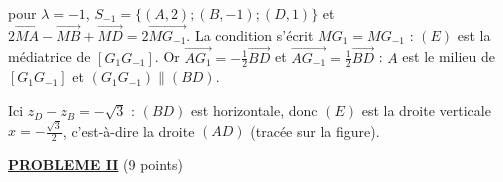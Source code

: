 \begin{description}
\begin{enumerate}
\begin{enumerate}
				pour $\lambda = -1$, $S_{-1} = \{(A,2);(B,-1);(D,1)\}$ et $2\overrightarrow{MA} - \overrightarrow{MB} + \overrightarrow{MD} = 2\overrightarrow{MG_{-1}}$.
				La condition s'écrit $MG_1 = MG_{-1}$ : $(E)$ est la médiatrice de $[G_1G_{-1}]$.
				Or $\overrightarrow{AG_1} = -\frac{1}{2}\overrightarrow{BD}$ et $\overrightarrow{AG_{-1}} = \frac{1}{2}\overrightarrow{BD}$ : $A$ est le milieu de $[G_1G_{-1}]$ et $(G_1G_{-1}) \parallel (BD)$.
				\par\noindent{}
				Ici $z_D - z_B = -\sqrt{3}$ : $(BD)$ est horizontale, donc $(E)$ est la droite verticale $x = -\frac{\sqrt{3}}{2}$, c'est-à-dire la droite $(AD)$ (tracée sur la figure).
		\end{enumerate}
	\end{enumerate}
\end{description}
\noindent \underline{\textsc{\textbf{PROBLEME II}}} (9 points)

